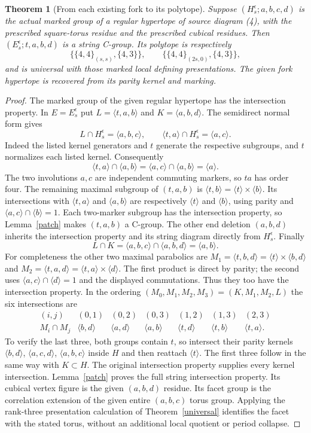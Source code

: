 \documentclass[11pt,a4paper]{article}
\newtheorem{theorem}{Theorem}
\newcommand{\gp}[1]{\langle #1\rangle}
\begin{document}
\begin{theorem}[From each existing fork to its polytope]\label{geometry}
Suppose $(H_s^\epsilon;a,b,c,d)$ is the actual marked group of a regular
hypertope of source diagram (4), with the prescribed square-torus residue
and the prescribed cubical residues. Then $(E_s^\epsilon;t,a,b,d)$ is
a string C-group. Its polytope is respectively
\[
 \bigl\{\{4,4\}_{(s,s)},\{4,3\}\bigr\},\qquad
 \bigl\{\{4,4\}_{(2s,0)},\{4,3\}\bigr\},
\]
and is universal with those marked local defining presentations. The
given fork hypertope is recovered from its parity kernel and marking.
\end{theorem}
\begin{proof}
The marked group of the given regular hypertope has the intersection
property. In $E=E_s^\epsilon$ put $L=\gp{t,a,b}$ and $K=\gp{a,b,d}$.
The semidirect normal form gives
\[
 L\cap H_s^\epsilon=\gp{a,b,c},\qquad
 \gp{t,a}\cap H_s^\epsilon=\gp{a,c}.
\]
Indeed the listed kernel generators and $t$ generate the respective
subgroups, and $t$ normalizes each listed kernel. Consequently
\[
 \gp{t,a}\cap\gp{a,b}
 =\gp{a,c}\cap\gp{a,b}=\gp a.
\]
The two involutions $a,c$ are independent commuting markers, so $ta$
has order four. The remaining maximal subgroup of $(t,a,b)$ is
$\gp{t,b}=\gp t\times\gp b$. Its intersections with $\gp{t,a}$ and
$\gp{a,b}$ are respectively $\gp t$ and $\gp b$, using parity and
$\gp{a,c}\cap\gp b=1$. Each two-marker subgroup has the intersection
property, so Lemma~\ref{patch} makes $(t,a,b)$ a C-group.
The other end deletion $(a,b,d)$ inherits the intersection
property and its string diagram directly from $H_s^\epsilon$. Finally
\[
 L\cap K=\gp{a,b,c}\cap\gp{a,b,d}=\gp{a,b}.
\]
For completeness the other two maximal parabolics are
$M_1=\gp{t,b,d}=\gp t\times\gp{b,d}$ and
$M_2=\gp{t,a,d}=\gp{t,a}\times\gp d$. The first product is direct by
parity; the second uses $\gp{a,c}\cap\gp d=1$ and the displayed
commutations. Thus they too have the intersection property. In the
ordering $(M_0,M_1,M_2,M_3)=(K,M_1,M_2,L)$ the six intersections are
\[
\begin{array}{c|cccccc}
(i,j)&(0,1)&(0,2)&(0,3)&(1,2)&(1,3)&(2,3)\\ \hline
M_i\cap M_j&\gp{b,d}&\gp{a,d}&\gp{a,b}&\gp{t,d}&\gp{t,b}&\gp{t,a}.
\end{array}
\]
To verify the last three, both groups contain $t$, so intersect their
parity kernels $\gp{b,d}$, $\gp{a,c,d}$, $\gp{a,b,c}$ inside $H$ and
then reattach $\gp t$. The first three follow in the same way with
$K\subset H$. The original intersection property supplies every kernel
intersection. Lemma~\ref{patch} proves the full string intersection
property. Its cubical vertex figure is the given $(a,b,d)$ residue.
Its facet group is the correlation extension of the given entire
$(a,b,c)$ torus group. Applying the rank-three presentation calculation
of Theorem~\ref{universal} identifies the facet with the stated torus,
without an additional local quotient or period collapse.


\end{proof}
\end{document}
